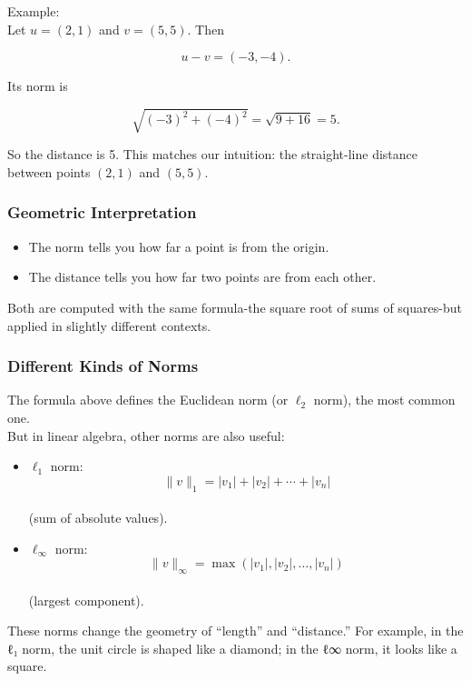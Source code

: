 \documentclass[
  letterpaper,
  DIV=11,
  numbers=noendperiod]{scrreprt}
\providecommand{\tightlist}{%
  \setlength{\itemsep}{0pt}\setlength{\parskip}{0pt}}
\begin{document}
Example:\\
Let \(u = (2, 1)\) and \(v = (5, 5)\). Then

\[
u - v = (-3, -4).
\]

Its norm is

\[
\sqrt{(-3)^2 + (-4)^2} = \sqrt{9 + 16} = 5.
\]

So the distance is 5. This matches our intuition: the straight-line
distance between points \((2, 1)\) and \((5, 5)\).

\subsubsection{Geometric Interpretation}\label{geometric-interpretation}

\begin{itemize}
\tightlist
\item
  The norm tells you how far a point is from the origin.
\item
  The distance tells you how far two points are from each other.
\end{itemize}

Both are computed with the same formula-the square root of sums of
squares-but applied in slightly different contexts.

\subsubsection{Different Kinds of Norms}\label{different-kinds-of-norms}

The formula above defines the Euclidean norm (or \(\ell_2\) norm), the
most common one.\\
But in linear algebra, other norms are also useful:

\begin{itemize}
\item
  \(\ell_1\) norm:\\
  \[
  \|v\|_1 = |v_1| + |v_2| + \cdots + |v_n|
  \]\\
  (sum of absolute values).
\item
  \(\ell_\infty\) norm:\\
  \[
  \|v\|_\infty = \max(|v_1|, |v_2|, \ldots, |v_n|)
  \]\\
  (largest component).
\end{itemize}

These norms change the geometry of ``length'' and ``distance.'' For
example, in the ℓ₁ norm, the unit circle is shaped like a diamond; in
the ℓ∞ norm, it looks like a square.
\end{document}
